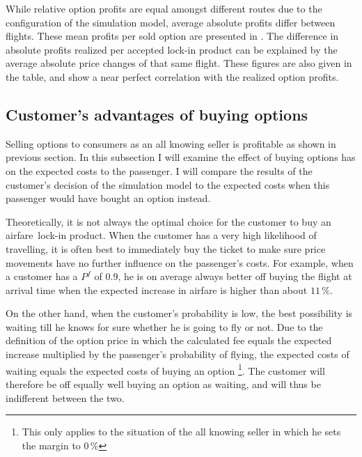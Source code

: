 While relative option profits are equal amongst different routes due to the configuration of the simulation model, average absolute profits differ between flights. These mean profits per sold option are presented in . The difference in absolute profits realized per accepted lock-in product can be explained by the average absolute price changes of that same flight. These figures are also given in the table, and show a near perfect correlation with the realized option profits.


\subsection{Customer's advantages of buying options}
Selling options to consumers as an all knowing seller is profitable as shown in previous section. In this subsection I will examine the effect of buying options has on the expected costs to the passenger. I will compare the results of the customer's decision of the simulation model to the expected costs when this passenger would have bought an option instead.

Theoretically, it is not always the optimal choice for the customer to buy an airfare~lock-in product. When the customer has a very high likelihood of travelling, it is often best to immediately buy the ticket to make sure price movements have no further influence on the passenger's costs. For example, when a customer has a $P^f$ of $0.9$, he is on average always better off buying the flight at arrival time when the expected increase in airfare is higher than about $11\,\%$.

On the other hand, when the customer's probability is low, the best possibility is waiting till he knows for sure whether he is going to fly or not. Due to the definition of the option price in which the calculated fee equals the expected increase multiplied by the passenger's probability of flying, the expected costs of waiting equals the expected costs of buying an option \footnote{This only applies to the situation of the all knowing seller in which he sets the margin to $0\,\%$}. The customer will therefore be off equally well buying an option as waiting, and will thus be indifferent between the two.

